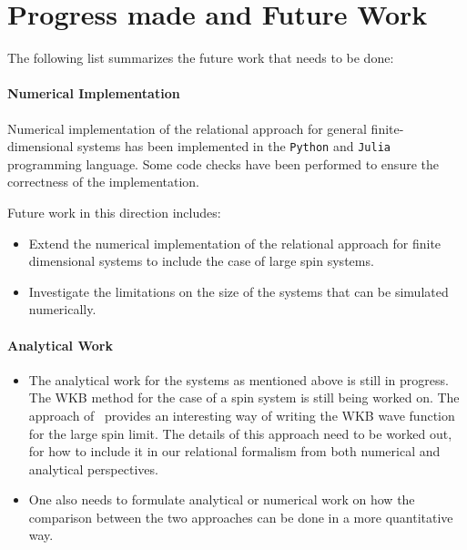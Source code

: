 \section{Progress made and Future Work}

The following list summarizes the future work that needs to be done:
\paragraph{Numerical Implementation} Numerical implementation of the relational approach for general finite-dimensional systems
has been implemented in the \texttt{Python} and \texttt{Julia} programming language. 
Some code checks have been performed to ensure the correctness of the implementation.

Future work in this direction includes:
\begin{itemize}
    \item Extend the numerical implementation of the relational approach for finite dimensional systems to include the case of large spin systems.
    \item Investigate the limitations on the size of the systems that can be simulated numerically.
\end{itemize}

\paragraph{Analytical Work}
\begin{itemize}
    \item The analytical work for the systems as mentioned above is still in progress. The WKB method for the case of a spin system is still being worked on. The approach of~\cite{van1986tunneling} provides an interesting way of writing the WKB wave function for the large spin limit. The details of this approach need to be worked out, for how to include it in our relational formalism from both numerical and analytical perspectives. 
    \item One also needs to formulate analytical or numerical work on how the comparison between the two approaches can be done in a more quantitative way. 
\end{itemize}